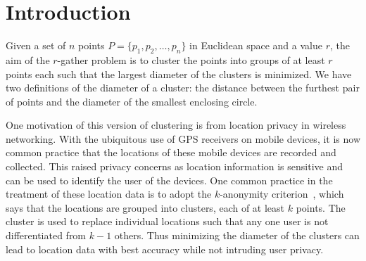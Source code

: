 
\pagebreak

\section{Introduction}

Given a set of $n$ points $P = \{p_1, p_2, \dots, p_n\}$ in Euclidean space and a value $r$, the aim of the $r$-gather problem is to cluster the points into groups of at least $r$ points each such that the largest diameter of the clusters is minimized. We have two definitions of the diameter of a cluster: the distance between the furthest pair of points and the diameter of the smallest enclosing circle.

One motivation of this version of clustering is from location privacy in wireless networking. With the ubiquitous use of GPS receivers on mobile devices, it is now common practice that the locations of these mobile devices are recorded and collected. This raised privacy concerns as location information is sensitive and can be used to identify the user of the devices. One common practice in the treatment of these location data is to adopt the $k$-anonymity criterion~\cite{Sweeney02}, which says that the locations are grouped into clusters, each of at least $k$ points. The cluster is used to replace individual locations such that any one user is not differentiated from $k-1$ others. Thus minimizing the diameter of the clusters can lead to location data with best accuracy while not intruding user privacy. 

\pagebreak